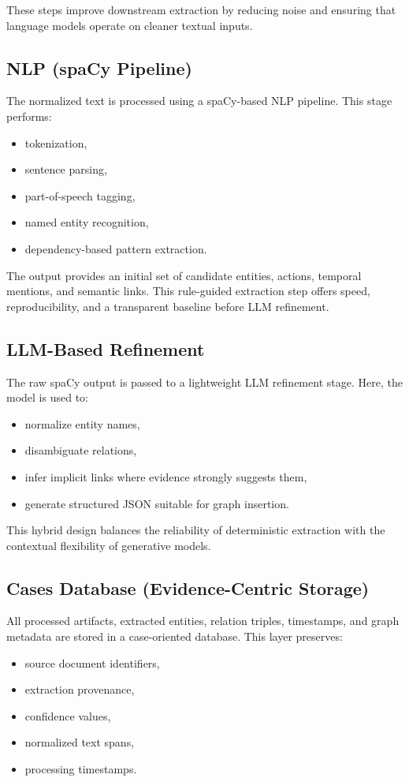 \documentclass{ieeeaccess}
\begin{document}
These steps improve downstream extraction by reducing noise and ensuring that language models operate on cleaner textual inputs.

\subsection{NLP (spaCy Pipeline)}
The normalized text is processed using a spaCy-based NLP pipeline. This stage performs:
\begin{itemize}
    \item tokenization,
    \item sentence parsing,
    \item part-of-speech tagging,
    \item named entity recognition,
    \item dependency-based pattern extraction.
\end{itemize}

The output provides an initial set of candidate entities, actions, temporal mentions, and semantic links. This rule-guided extraction step offers speed, reproducibility, and a transparent baseline before LLM refinement.

\subsection{LLM-Based Refinement}
The raw spaCy output is passed to a lightweight LLM refinement stage. Here, the model is used to:
\begin{itemize}
    \item normalize entity names,
    \item disambiguate relations,
    \item infer implicit links where evidence strongly suggests them,
    \item generate structured JSON suitable for graph insertion.
\end{itemize}

This hybrid design balances the reliability of deterministic extraction with the contextual flexibility of generative models.

\subsection{Cases Database (Evidence-Centric Storage)}
All processed artifacts, extracted entities, relation triples, timestamps, and graph metadata are stored in a case-oriented database. This layer preserves:
\begin{itemize}
    \item source document identifiers,
    \item extraction provenance,
    \item confidence values,
    \item normalized text spans,
    \item processing timestamps.
\end{itemize}
\end{document}

